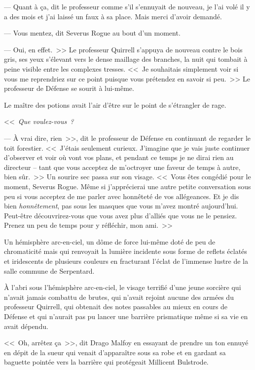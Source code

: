 --- Quant à ça, dit le professeur comme s'il s'ennuyait de nouveau, je l'ai volé il y a des mois et j'ai laissé un faux à sa place. Mais merci d'avoir demandé.

--- Vous mentez, dit Severus Rogue au bout d'un moment.

--- Oui, en effet.~>> Le professeur Quirrell s'appuya de nouveau contre le bois gris, ses yeux s'élevant vers le dense maillage des branches, la nuit qui tombait à peine visible entre les complexes tresses. <<~Je souhaitais simplement voir si vous me reprendriez sur ce point puisque vous prétendez en savoir si peu.~>> Le professeur de Défense se sourit à lui-même.

Le maître des potions avait l'air d'être sur le point de s'étrangler de rage.

<<~\emph{Que voulez-vous~?}

--- À vrai dire, rien~>>, dit le professeur de Défense en continuant de regarder le toit forestier. <<~J'étais seulement curieux. J'imagine que je vais juste continuer d'observer et voir où vont vos plans, et pendant ce temps je ne dirai rien au directeur -- tant que vous acceptez de m'octroyer une faveur de temps à autre, bien sûr.~>> Un sourire sec passa sur son visage. <<~Vous êtes congédié pour le moment, Severus Rogue. Même si j'apprécierai une autre petite conversation sous peu si vous acceptez de me parler avec honnêteté de vos allégeances. Et je dis bien \emph{honnêtement}, pas sous les masques que vous m'avez montré aujourd'hui. Peut-être découvrirez-vous que vous avez plus d'alliés que vous ne le pensiez. Prenez un peu de temps pour y réfléchir, mon ami.~>>


Un hémisphère arc-en-ciel, un dôme de force lui-même doté de peu de chromaticité mais qui renvoyait la lumière incidente sous forme de reflets éclatés et iridescents de plusieurs couleurs en fracturant l'éclat de l'immense lustre de la salle commune de Serpentard.

À l'abri sous l'hémisphère arc-en-ciel, le visage terrifié d'une jeune sorcière qui n'avait jamais combattu de brutes, qui n'avait rejoint aucune des armées du professeur Quirrell, qui obtenait des notes passables au mieux en cours de Défense et qui n'aurait pas pu lancer une barrière prismatique même si sa vie en avait dépendu.

<<~Oh, arrêtez ça~>>, dit Drago Malfoy en essayant de prendre un ton ennuyé en dépit de la sueur qui venait d'apparaître sous sa robe et en gardant sa baguette pointée vers la barrière qui protégeait Millicent Bulstrode.


